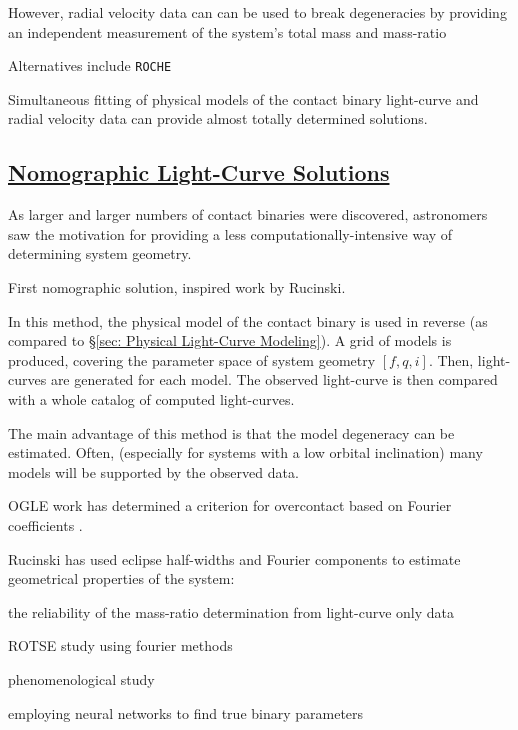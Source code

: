 \documentclass[12pt]{article} %
\numberwithin{equation}{section} %
\begin{document}
However, radial velocity data can can be used to break degeneracies by providing an independent measurement of the system's total mass and mass-ratio 

Alternatives include \texttt{ROCHE}  \citep{pribulla2012roche}

Simultaneous fitting of physical models of the contact binary light-curve and radial velocity data can provide almost totally determined solutions. 

\subsection[Nomographic Light-Curve Solutions]{\hyperlink{toc}{Nomographic Light-Curve Solutions}} \label{sec: Nomographic Light-Curve Solutions}

As larger and larger numbers of contact binaries were discovered, astronomers saw the motivation for providing a less computationally-intensive way of determining system geometry. 

\citet{mochnacki1972model} First nomographic solution, inspired work by Rucinski. \citep{rucinski1973w}

In this method, the physical model of the contact binary is used in reverse (as compared to \S\ref{sec: Physical Light-Curve Modeling}). A grid of models is produced, covering the parameter space of system geometry $[f,q,i]$. Then, light-curves are generated for each model. The observed light-curve is then compared with a whole catalog of computed light-curves. 

The main advantage of this method is that the model degeneracy can be estimated. Often, (especially for systems with a low orbital inclination) many models will be supported by the observed data.

OGLE work has determined a criterion for overcontact based on Fourier coefficients \citep{rucinski1997eclipsing}. \citep{rucinski1993simple}

Rucinski has used eclipse half-widths and Fourier components to estimate geometrical properties of the system:

the reliability of the mass-ratio determination from light-curve only data \citep{hambalek2013reliability}

ROTSE study using fourier methods \citep{coker2013study}

phenomenological study \citep{andronov2012phenomenological}

employing neural networks to find true binary parameters \citep{zeraatgari2015neural}
\end{document}
